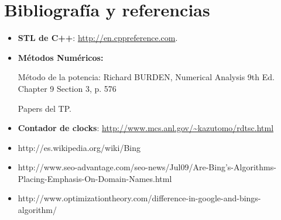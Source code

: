 \section{Bibliografía y referencias} %

\begin{itemize}
	\item \textbf{STL de C++}: \url{http://en.cppreference.com}.
	\item \textbf{Métodos Numéricos:}
		\par Método de la potencia: Richard BURDEN, Numerical Analysis 9th Ed. Chapter 9 Section 3, p. 576
		\par Papers del TP.
	\item \textbf{Contador de clocks}: \url{http://www.mcs.anl.gov/\~kazutomo/rdtsc.html}
	\item http://es.wikipedia.org/wiki/Bing
	\item http://www.seo-advantage.com/seo-news/Jul09/Are-Bing's-Algorithms-Placing-Emphasis-On-Domain-Names.html
	\item http://www.optimizationtheory.com/difference-in-google-and-bings-algorithm/
\end{itemize}



